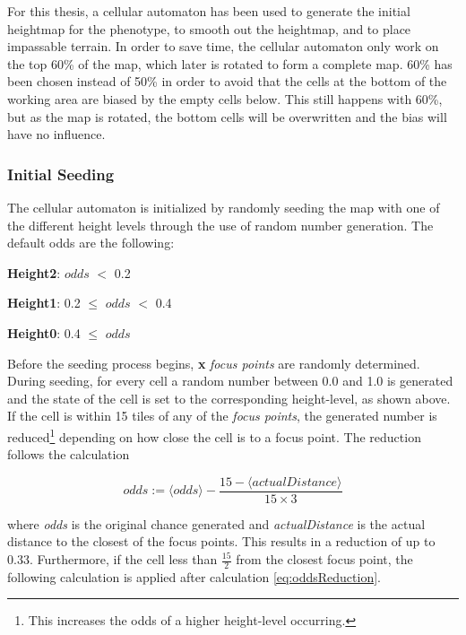 For this thesis, a cellular automaton has been used to generate the initial heightmap for the phenotype, to smooth out the heightmap, and to place impassable terrain. In order to save time, the cellular automaton only work on the top 60\% of the map, which later is rotated to form a complete map. 60\% has been chosen instead of 50\% in order to avoid that the cells at the bottom of the working area are biased by the empty cells below. This still happens with 60\%, but as the map is rotated, the bottom cells will be overwritten and the bias will have no influence.

\subsubsection{Initial Seeding}
\label{methodology_ca_our_initial}

The cellular automaton is initialized by randomly seeding the map with one of the different height levels through the use of random number generation. The default odds are the following:

\begin{my_itemize}

	\item \textbf{Height2}: $odds$ $<$ 0.2

	\item \textbf{Height1}: 0.2 $\le$ $odds$ $<$ 0.4

	\item \textbf{Height0}: 0.4 $\le$ $odds$

\end{my_itemize}

Before the seeding process begins, \textbf{x} \textit{focus points} are randomly determined. During seeding, for every cell a random number between 0.0 and 1.0 is generated and the state of the cell is set to the corresponding height-level, as shown above. If the cell is within 15 tiles of any of the \textit{focus points}, the generated number is reduced\footnote{This increases the odds of a higher height-level occurring.} depending on how close the cell is to a focus point. The reduction follows the calculation

\begin{equation} \label{eq:oddsReduction}
	odds := \langle odds\rangle - \frac{15 - \langle actualDistance\rangle}{15 \times 3}
\end{equation}

where \textit{odds} is the original chance generated and \textit{actualDistance} is the actual distance to the closest of the focus points. This results in a reduction of up to 0.33. Furthermore, if the cell less than $\frac{15}{2}$ from the closest focus point, the following calculation is applied after calculation \ref{eq:oddsReduction}.

